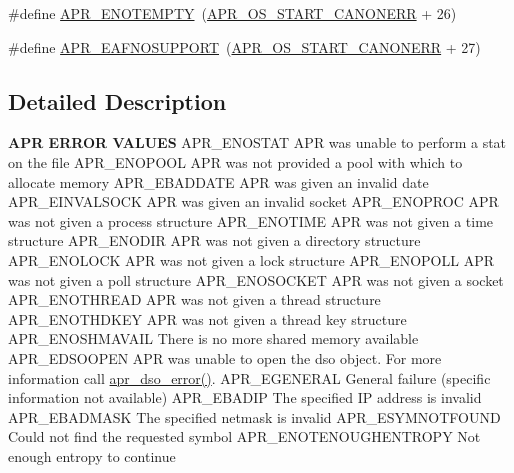 \begin{DoxyCompactItemize}
\item 
\#define \hyperlink{group___a_p_r___error_ga01d9259eccdf0576f58b89c4ad8ca4eb}{A\-P\-R\-\_\-\-E\-N\-O\-T\-E\-M\-P\-T\-Y}~(\hyperlink{group__apr__errno_ga7bca957c11b80b31cb54b0d2cbe9e025}{A\-P\-R\-\_\-\-O\-S\-\_\-\-S\-T\-A\-R\-T\-\_\-\-C\-A\-N\-O\-N\-E\-R\-R} + 26)
\item 
\#define \hyperlink{group___a_p_r___error_ga76b558840838bcb94a4811a8e52df7a6}{A\-P\-R\-\_\-\-E\-A\-F\-N\-O\-S\-U\-P\-P\-O\-R\-T}~(\hyperlink{group__apr__errno_ga7bca957c11b80b31cb54b0d2cbe9e025}{A\-P\-R\-\_\-\-O\-S\-\_\-\-S\-T\-A\-R\-T\-\_\-\-C\-A\-N\-O\-N\-E\-R\-R} + 27)
\end{DoxyCompactItemize}


\subsection{Detailed Description}

\begin{DoxyPre}
{\bfseries APR ERROR VALUES}
APR\_ENOSTAT      APR was unable to perform a stat on the file
APR\_ENOPOOL      APR was not provided a pool with which to allocate memory
APR\_EBADDATE     APR was given an invalid date
APR\_EINVALSOCK   APR was given an invalid socket
APR\_ENOPROC      APR was not given a process structure
APR\_ENOTIME      APR was not given a time structure
APR\_ENODIR       APR was not given a directory structure
APR\_ENOLOCK      APR was not given a lock structure
APR\_ENOPOLL      APR was not given a poll structure
APR\_ENOSOCKET    APR was not given a socket
APR\_ENOTHREAD    APR was not given a thread structure
APR\_ENOTHDKEY    APR was not given a thread key structure
APR\_ENOSHMAVAIL  There is no more shared memory available
APR\_EDSOOPEN     APR was unable to open the dso object.  For more
                 information call \hyperlink{group__apr__dso_gafa34fc75e1e9b8856385d3b18cfac05c}{apr\_dso\_error()}.
APR\_EGENERAL     General failure (specific information not available)
APR\_EBADIP       The specified IP address is invalid
APR\_EBADMASK     The specified netmask is invalid
APR\_ESYMNOTFOUND Could not find the requested symbol
APR\_ENOTENOUGHENTROPY Not enough entropy to continue
\end{DoxyPre}




